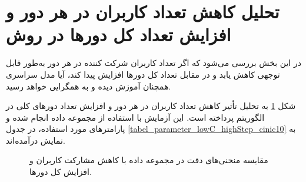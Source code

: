\section{
	تحلیل کاهش تعداد کاربران در هر دور و افزایش تعداد کل دورها در روش
}
در این بخش بررسی می‌شود که اگر تعداد کاربران شرکت کننده در هر دور به‌طور قابل توجهی کاهش یابد و در مقابل تعداد کل دورها افزایش پیدا کند، آیا مدل سراسری همچنان آموزش دیده و به همگرایی خواهد رسید.

شکل
\ref{result_lowC_highStep_cinic10}
به تحلیل تأثیر کاهش تعداد کاربران در هر دور و افزایش تعداد دورهای کلی در الگوریتم
پرداخته است. این آزمایش با استفاده از مجموعه داده
انجام شده و پارامترهای مورد استفاده، در جدول
\ref{tabel_parameter_lowC_highStep_cinic10}
به نمایش درآمده‌اند.

\begin{figure}[t]
	\centering
	\hspace{0.8mm}
	\caption{
		مقایسه منحنی‌های دقت در مجموعه داده
		با کاهش مشارکت کاربران و افزایش  کل دورها.
	}
	\label{result_lowC_highStep_cinic10}
\end{figure}


